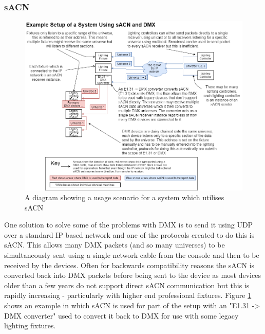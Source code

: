 \documentclass[11pt,a4paper]{article}
\begin{document}
\subsubsection{sACN}
\begin{figure}[H]
	\includegraphics[width=\textwidth]{CS4099-Expected-Usage.png}
	\caption{A diagram showing a usage scenario for a system which utilises sACN}
	\label{Expected_usage}
\end{figure}

One solution to solve some of the problems with DMX is to send it using UDP over a standard IP based network and one of the protocols created to do this is sACN. This allows many DMX packets (and so many universes) to be simultaneously sent using a single network cable from the console and then to be received by the devices. Often for backwards compatibility reasons the sACN is converted back into DMX packets before being sent to the device as most devices older than a few years do not support direct sACN communication but this is rapidly increasing - particularly with higher end professional fixtures. Figure \ref{Expected_usage} shows an example in which sACN is used for part of the setup with an "E1.31 -> DMX converter" used to convert it back to DMX for use with some legacy lighting fixtures. 
\end{document}
